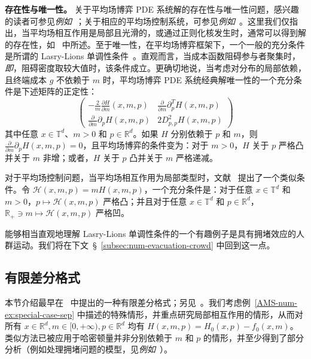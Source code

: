 \documentclass{amsproc}
\theoremstyle{definition}
\theoremstyle{remark}
\numberwithin{equation}{section}
\newcommand{\RR}{{\mathbb R}}
\newcommand{\TT}{{\mathbb T}}
\begin{document}
\textbf{存在性与唯一性。} 关于平均场博弈 PDE 系统解的存在性与唯一性问题，感兴趣的读者可参见\textit{例如}~\cite{PLL-CDF,MR2295621,Cardaliaguet-2013-notes}；关于相应的平均场控制系统，可参见\textit{例如}~\cite{MR3392611,MR3498932}。这里我们仅指出，当平均场相互作用是局部且光滑的，或通过正则化核发生时，通常可以得到解的存在性，如~\cite{MR2295621} 中所述。至于唯一性，在平均场博弈框架下，一个一般的充分条件是所谓的 Lasry-Lions 单调性条件~\cite{MR2295621}。直观而言，当成本函数阻碍参与者聚集时，\textit{即}，阻碍密度取较大值时，该条件成立。更确切地说，当考虑对分布的局部依赖，且终端成本 $g$ 不依赖于 $m$ 时，平均场博弈 PDE 系统经典解唯一性的一个充分条件是下述矩阵的正定性：
$$
  \begin{pmatrix}
 - \frac{2}{m} \frac {\partial H} {\partial m}    \left(x, m, p\right) &   \frac {\partial } {\partial m}  \partial_p ^T H(x, m, p)
\\
 \frac {\partial } {\partial m}  \partial_p H(x, m, p) & 2D^2_{p,p} H(x, m, p)
 \end{pmatrix}
$$
其中任意 $x\in \TT^d$、$m>0$ 和 $p\in \RR^d$。如果 $H$ 分别依赖于 $p$ 和 $m$，则 $\frac {\partial } {\partial m}  \partial_p H (x, m, p)=0$，且平均场博弈的条件变为：对于 $m>0$，$H$ 关于 $p$ 严格凸并关于 $m$ 非增；或者，$H$ 关于 $p$ 凸并关于 $m$ 严格递减。

对于平均场控制问题，当平均场相互作用为局部类型时，文献~\cite{MR3392611} 提出了一个类似条件。令 $\mathcal{H}(x, m, p) = m H(x, m, p)$，一个充分条件是：对于任意 $x \in \TT^d$ 和 $m>0$，$p \mapsto \mathcal{H}(x, m, p)$ 严格凸；并且对于任意 $x \in \TT^d$ 和 $p \in \RR^d$，$\RR_+  \ni m \mapsto \mathcal{H}(x, m, p)$ 严格凹。



	 
	 
	 
能够相当直观地理解 Lasry-Lions 单调性条件的一个有趣例子是具有拥堵效应的人群运动。我们将在下文~\S~\ref{subsec:num-evacuation-crowd} 中回到这一点。
 








\subsection{有限差分格式}
\label{AMS-num-sec:fin-diff}


本节介绍最早在~\cite{MR2679575} 中提出的一种有限差分格式；另见~\cite{MR3135339}。我们考虑例~\ref{AMS-num-ex:special-case-sep} 中描述的特殊情形，并重点研究局部相互作用的情形，从而对所有 $x \in \RR^d, m \in [0,+\infty), p \in \RR^d$ 均有 $H(x,m,p) = H_0(x,p) - f_0(x,m)$。类似方法已被应用于哈密顿量并非分别依赖于 $m$ 和 $p$ 的情形，并至少得到了部分分析（例如处理拥堵问题的模型，见\textit{例如}~\cite{YAJML}）。
\end{document}

